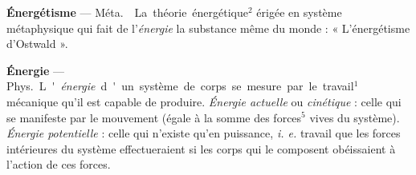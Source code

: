 {\bf Énergétisme} — \si{Méta.}  La théorie
énergétique$^2$ érigée en système métaphysique qui fait de l'{\it énergie}
la substance même du monde : « L’énergétisme d'Ostwald ».

{\bf Énergie} — \si{Phys.} L'{\it énergie} d'un système de corps se mesure
par le travail$^1$ mécanique qu’il est capable
de produire. {\it Énergie actuelle} ou
{\it cinétique} : celle qui se manifeste par
le mouvement (égale à la somme
des forces$^5$ vives du système).
{\it Énergie potentielle} : celle qui n'existe
qu’en puissance, {\it i. e.} travail que les
forces intérieures du système effectueraient si les corps qui le composent obéissaient à l'action de ces
forces.

